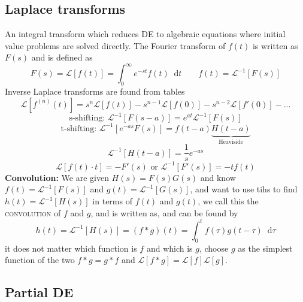 \documentclass[a4paper, 10pt]{article}
\newcommand*\diff{\mathop{}\!\mathrm{d}}
\begin{document}
\begin{multicols*}{3}
\begin{mdframed}
\subsection*{Laplace transforms}
\end{mdframed}
An integral transform which reduces DE to algebraic equations where initial value problems are solved directly. The Fourier transform of $f(t)$ is written as $F(s)$ and is defined as
$$ F(s) = \mathcal{L}\left[ f(t) \right] = \int_0^\infty e^{-st} f(t) \diff t \qquad f(t) = \mathcal{L}^{-1}\left[ F(s) \right]$$
Inverse Laplace transforms are found from tables
$$ \mathcal{L}\left[ f^{(n)}(t) \right] = s^n\mathcal{L}\left[ f(t) \right]-s^{n-1}\mathcal{L}\left[ f(0) \right]-s^{n-2}\mathcal{L}\left[ f'(0) \right] - ...$$
$$ \text{s-shifting: }\mathcal{L}^{-1}\left[ F(s-a) \right] = e^{at}\mathcal{L}^{-1}\left[ F(s)\right] $$
$$ \text{t-shifting: }\mathcal{L}^{-1}\left[ e^{-as}F(s) \right] = f(t-a)\underbrace{H(t-a)}_{\text{Heaviside}}$$
$$ \mathcal{L}^{-1}\left[ H(t-a) \right] = \frac{1}{s}e^{-as}$$
$$ \mathcal{L}\left[ f(t)\cdot t \right] = -F'(s) \text{  or  } \mathcal{L}^{-1}\left[F'(s)\right] = -tf(t)$$
\textbf{Convolution:}
We are given $H(s) = F(s)G(s)$ and know $f(t) = \mathcal{L}^{-1}\left[F(s)\right]$ and $g(t) = \mathcal{L}^{-1}\left[G(s)\right]$, and want to use tihs to find $h(t) = \mathcal{L}^{-1}\left[H(s)\right]$ in terms of $f(t)$ and $g(t)$, we call this the \textsc{convolution} of $f$ and $g$, and is written as, and can be found by
$$h(t) = \mathcal{L}^{-1}\left[H(s)\right] = \left( f*g\right)(t) = \int_0^t f(\tau)g(t-\tau) \diff \tau$$
it does not matter which function is $f$ and which is $g$, choose $g$ as the simplest function of the two $f*g=g*f$ and $\mathcal{L}\left[f*g\right]=\mathcal{L}\left[f\right]\mathcal{L}\left[g\right]$.


\begin{mdframed}
\subsection*{Partial DE}
\end{mdframed}

\end{multicols*}
\end{document}
